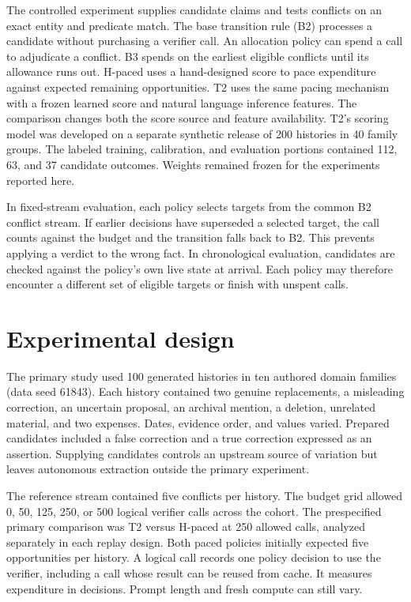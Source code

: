\documentclass[11pt]{article}
\begin{document}
The controlled experiment supplies candidate claims and tests conflicts on an exact entity and predicate match. The base transition rule (B2) processes a candidate without purchasing a verifier call. An allocation policy can spend a call to adjudicate a conflict. B3 spends on the earliest eligible conflicts until its allowance runs out. H-paced uses a hand-designed score to pace expenditure against expected remaining opportunities. T2 uses the same pacing mechanism with a frozen learned score and natural language inference features. The comparison changes both the score source and feature availability. T2’s scoring model was developed on a separate synthetic release of 200 histories in 40 family groups. The labeled training, calibration, and evaluation portions contained 112, 63, and 37 candidate outcomes. Weights remained frozen for the experiments reported here.

In fixed-stream evaluation, each policy selects targets from the common B2 conflict stream. If earlier decisions have superseded a selected target, the call counts against the budget and the transition falls back to B2. This prevents applying a verdict to the wrong fact. In chronological evaluation, candidates are checked against the policy’s own live state at arrival. Each policy may therefore encounter a different set of eligible targets or finish with unspent calls.

\section{Experimental design}

The primary study used 100 generated histories in ten authored domain families (data seed 61843). Each history contained two genuine replacements, a misleading correction, an uncertain proposal, an archival mention, a deletion, unrelated material, and two expenses. Dates, evidence order, and values varied. Prepared candidates included a false correction and a true correction expressed as an assertion. Supplying candidates controls an upstream source of variation but leaves autonomous extraction outside the primary experiment.

The reference stream contained five conflicts per history. The budget grid allowed 0, 50, 125, 250, or 500 logical verifier calls across the cohort. The prespecified primary comparison was T2 versus H-paced at 250 allowed calls, analyzed separately in each replay design. Both paced policies initially expected five opportunities per history. A logical call records one policy decision to use the verifier, including a call whose result can be reused from cache. It measures expenditure in decisions. Prompt length and fresh compute can still vary.
\end{document}
